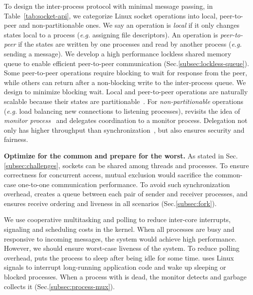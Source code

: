 To design the inter-process protocol with minimal message passing, in Table~\ref{tab:socket-api}, we categorize Linux socket operations into local, peer-to-peer and non-partitionable ones. We say an operation is \textit{local} if it only changes states local to a process (\textit{e.g.} assigning file descriptors). An operation is \textit{peer-to-peer} if the states are written by one processes and read by another process (\textit{e.g.} sending a message). We develop a high performance lockless shared memory queue to enable efficient peer-to-peer communication (Sec.\ref{subsec:lockless-queue}). Some peer-to-peer operations require blocking to wait for response from the peer, while others can return after a non-blocking write to the inter-process queue. We design to minimize blocking wait. Local and peer-to-peer operations are naturally scalable because their states are partitionable~\cite{partitionable}. For \textit{non-partitionable} operations (\textit{e.g.} load balancing new connections to listening processes), \libipc revisits the idea of \textit{monitor process}~\cite{hoare1974monitors} and delegates coordination to a monitor process. Delegation not only has higher throughput than synchronization~\cite{roghanchi2017ffwd}, but also ensures security and fairness.


\textbf{Optimize for the common and prepare for the worst.}
As stated in Sec.\ref{subsec:challenges}, sockets can be shared among threads and processes. To ensure correctness for concurrent access, mutual exclusion would sacrifice the common-case one-to-one communication performance. To avoid such synchronization overhead, \libipc creates a queue between each pair of sender and receiver processes, and ensures receive ordering and liveness in all scenarios (Sec.\ref{subsec:fork}).

We use cooperative multitasking and polling to reduce inter-core interrupts, signaling and scheduling costs in the kernel. When all processes are busy and responsive to incoming messages, the system would achieve high performance. However, we should ensure worst-case liveness of the system. To reduce polling overhead, \libipc puts the process to sleep after being idle for some time. \libipc uses Linux signals to interrupt long-running application code and wake up sleeping or blocked processes. When a process with \libipc is dead, the monitor detects and garbage collects it (Sec.\ref{subsec:process-mux}).

